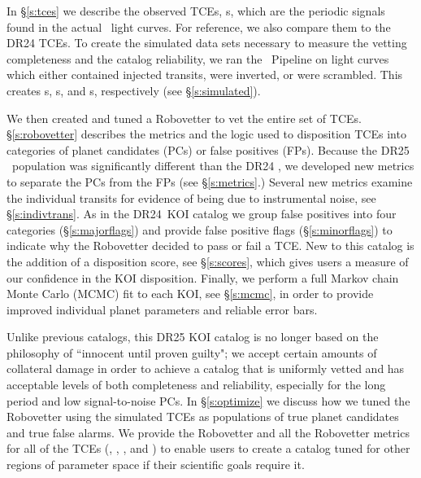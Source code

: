 In \S\ref{s:tces} we describe the observed TCEs, \opstce s, which are the periodic signals found in the actual \Kepler\ light curves. For reference, we also compare them to the DR24 TCEs. To create the simulated data sets necessary to measure the vetting completeness and the catalog reliability, we ran the \Kepler\ Pipeline on light curves which either contained injected transits, were inverted, or were scrambled. This creates \injtce s, \invtce s, and \scrtce s, respectively (see \S\ref{s:simulated}).  

We then created and tuned a Robovetter to vet the entire set of TCEs. \S\ref{s:robovetter} describes the metrics and the logic used to disposition TCEs into categories of planet candidates (PCs) or false positives (FPs).  Because the DR25 \opstce\ population was significantly different than the DR24 , we developed new metrics to separate the PCs from the FPs (see \S\ref{s:metrics}.) Several new metrics examine the individual transits for evidence of being due to instrumental noise, see \S\ref{s:indivtrans}. As in the DR24~KOI catalog we group false positives into four categories (\S\ref{s:majorflags}) and provide false positive flags (\S\ref{s:minorflags}) to indicate why the Robovetter decided to pass or fail a TCE.  New to this catalog is the addition of a disposition score, see \S\ref{s:scores}, which gives users a measure of our confidence in the KOI disposition. Finally, we perform a full Markov chain Monte Carlo (MCMC) fit to each KOI, see \S\ref{s:mcmc}, in order to provide improved individual planet parameters and reliable error bars.


Unlike previous catalogs, this DR25 KOI catalog is no longer based on the philosophy of ``innocent until proven guilty"; we accept certain amounts of collateral damage in order to achieve a catalog that is uniformly vetted and has acceptable levels of both completeness and reliability, especially for the long period and low signal-to-noise PCs. In \S\ref{s:optimize} we discuss how we tuned the Robovetter using the simulated TCEs as populations of true planet candidates and true false alarms. We provide the Robovetter and all the Robovetter metrics for all of the TCEs (\opstce, \injtce, \invtce, and \scrtce) to enable users to create a catalog tuned for other regions of parameter space if their scientific goals require it. 

